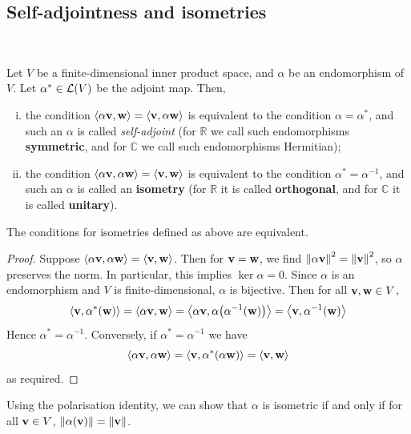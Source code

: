 \documentclass[a4paper,11pt]{article}
\begin{document}
\subsection{Self-adjointness and isometries}
\ \vspace*{-1.5em}
\begin{definition}
	Let \( V \) be a finite-dimensional inner product space, and \( \alpha \) be an endomorphism of \( V \).
	Let \( \alpha^* \in {\mathcal{L}}(V) \) be the adjoint map.
	Then,
	\begin{enumerate}[(i)]
		\item the condition \( \left\langle{\alpha {\bf v}, {\bf w}}\right\rangle = \left\langle{{\bf v}, \alpha {\bf w}}\right\rangle \) is equivalent to the condition \( \alpha = \alpha^* \), and such an \( \alpha \) is called \textit{self-adjoint} (for \( \mathbb R \) we call such endomorphisms \textbf{symmetric}, and for \( \mathbb C \) we call such endomorphisms Hermitian);
		\item the condition \( \left\langle{\alpha {\bf v}, \alpha {\bf w}}\right\rangle = \left\langle{{\bf v}, {\bf w}}\right\rangle \) is equivalent to the condition \( \alpha^* = \alpha^{-1} \), and such an \( \alpha \) is called an \textbf{isometry} (for \( \mathbb R \) it is called \textbf{orthogonal}, and for \( \mathbb C \) it is called \textbf{unitary}).
	\end{enumerate}
\end{definition}
\begin{proposition}
	The conditions for isometries defined as above are equivalent.
\end{proposition}
\begin{proof}
	Suppose \( \left\langle{\alpha {\bf v}, \alpha {\bf w}}\right\rangle = \left\langle{{\bf v},{\bf w}}\right\rangle \).
	Then for \( {\bf v} = {\bf w} \), we find \( \norm{\alpha {\bf v}}^2 = \norm{{\bf v}}^2 \), so \( \alpha \) preserves the norm.
	In particular, this implies \( \ker \alpha = \qty{0} \).
	Since \( \alpha \) is an endomorphism and \( V \) is finite-dimensional, \( \alpha \) is bijective.
	Then for all \( {\bf v}, {\bf w} \in V \),
	\[
		\left\langle{{\bf v}, \alpha^*({\bf w})}\right\rangle = \left\langle{\alpha {\bf v}, {\bf w}}\right\rangle = \left\langle{\alpha {\bf v}, \alpha\qty(\alpha^{-1}({\bf w}))}\right\rangle = \left\langle{{\bf v}, \alpha^{-1}({\bf w})}\right\rangle
	\]
	Hence \( \alpha^* = \alpha^{-1} \).
	Conversely, if \( \alpha^* = \alpha^{-1} \) we have
	\[
		\left\langle{\alpha {\bf v}, \alpha {\bf w}}\right\rangle = \left\langle{{\bf v}, \alpha^*(\alpha {\bf w})}\right\rangle = \left\langle{{\bf v}, {\bf w}}\right\rangle
	\]
	as required.
\end{proof}
\begin{remark}
	Using the polarisation identity, we can show that \( \alpha \) is isometric if and only if for all \( {\bf v} \in V \), \( \norm{\alpha({\bf v})} = \norm{{\bf v}} \).
\end{remark}
\end{document}
